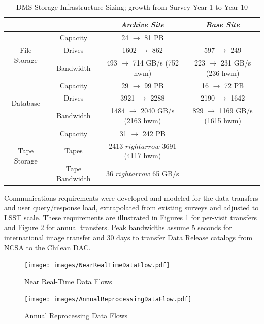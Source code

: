 \begin{table}
\centering
\begin{longtable}{|c|c|c|c|}
\hline
	& & \textit{Archive Site} & \textit{Base Site} \\ \hline
\multirow{3}{*}{File Storage} & Capacity & 24 $\rightarrow$ 81 PB & \\ \cline{2-4}
  & Drives & 1602 $\rightarrow$ 862 & 597 $\rightarrow$ 249 \\ \cline{2-4}
  & Bandwidth & 493 $\rightarrow$ 714 GB/s (752 hwm) & 223 $\rightarrow$ 231 GB/s (236 hwm) \\ \hline
\multirow{3}{*}{Database} & Capacity & 29 $\rightarrow$ 99 PB & 16 $\rightarrow$ 72 PB \\ \cline{2-4}
  & Drives & 3921 $\rightarrow$ 2288 & 2190 $\rightarrow$ 1642 \\ \cline{2-4}
  & Bandwidth & 1484 $\rightarrow$ 2040 GB/s (2163 hwm) & 829 $\rightarrow$ 1169 GB/s (1615 hwm) \\ \hline
\multirow{3}{*}{Tape Storage} & Capacity & 31 $\rightarrow$ 242 PB & \\ \cline{2-4}
  & Tapes & 2413 $rightarrow$ 3691 (4117 hwm) & \\ \cline{2-4}
  & Tape Bandwidth & 36 $rightarrow$ 65 GB/s & \\ \hline
\end{longtable}
\caption{DMS Storage Infrastructure Sizing; growth from Survey Year 1 to Year 10}
\label{table:storage-sizing}
\end{table}

Communications requirements were developed and modeled for the data transfers
and user query/response load, extrapolated from existing surveys and adjusted
to LSST scale.  These requirements are illustrated in Figures \ref{fig:near-real-time-flows} for per-visit transfers and Figure \ref{fig:annual-reprocessing-flows} for annual transfers.  Peak bandwidths assume 5 seconds for international
image transfer and 30 days to transfer Data Release catalogs from NCSA to the
Chilean DAC.

\begin{figure}
\centering
\texttt{[image: images/NearRealTimeDataFlow.pdf]}
\caption{Near Real-Time Data Flows}
\label{fig:near-real-time-flows}
\end{figure}

\begin{figure}
\centering
\texttt{[image: images/AnnualReprocessingDataFlow.pdf]}
\caption{Annual Reprocessing Data Flows}
\label{fig:annual-reprocessing-flows}
\end{figure}

